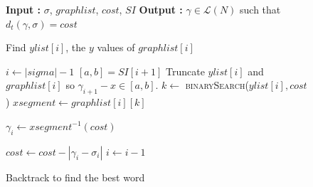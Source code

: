 \documentclass[conference]{IEEEtran}
\makeatletter
\newcommand{\removelatexerror}{\let\@latex@error\@gobble}
\makeatother
\begin{document}
		\begin{figure}[!t]
			\removelatexerror
			\begin{algorithm}[H]
				\caption{Backtrack to find the best word}
				\label{AuxFunc3}
				\begin{algorithmic}
					\State \textbf{Input : }  $\sigma$, $graphlist$, $cost$, $SI$
					\State \textbf{Output : }  $\gamma \in \mathcal{L}(N)$ such that $d_t(\gamma, \sigma) = cost$
					
					\State Find $ylist[i]$, the $y$ values of $graphlist[i]$
					\EndFor
					
					\State $i \gets |sigma|-1$
					\State $[a, b] = SI[i+1]$ 
					\State Truncate $ylist[i]$ and $graphlist[i]$ so $ \gamma_{i+1} - x \in [a, b]$. 
					\State $k \gets $ \textsc{binarySearch}($ylist[i], cost$)
					\State $xsegment \gets graphlist[i][k]$
					
					\State $\gamma_i \gets xsegment^{-1}(cost)$
					
					\State $cost \gets cost - |\gamma_i - \sigma_i|$
					\State $i \gets i-1$
					\EndWhile
					
				\end{algorithmic}
			\end{algorithm}
		\end{figure}
		
\end{document}
